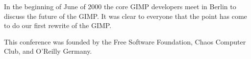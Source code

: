 In the beginning of June of 2000 the core GIMP developers meet in Berlin to discuss the future of the GIMP. It was clear to everyone that the point has come to do our first rewrite of the GIMP.   

This conference was founded by the Free Software Foundation, Chaos Computer Club, and O'Reilly Germany. 

